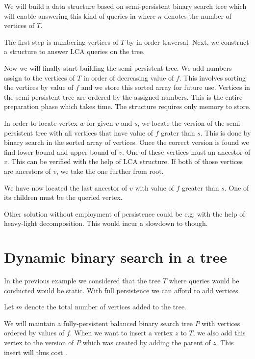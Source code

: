 We will build a data structure based on semi-persistent binary search tree which will enable answering this kind of queries in  where $n$ denotes the number of vertices of $T$.

The first step is numbering vertices of $T$ by in-order traversal. Next, we construct a structure to answer LCA queries on the tree. %

Now we will finally start building the semi-persistent tree. We add numbers assign to the vertices of $T$ in order of decreasing value of $f$. This involves sorting the vertices by value of $f$ and we store this sorted array for future use. Vertices in the semi-persistent tree are ordered by the assigned numbers. This is the entire preparation phase which takes  time. The structure requires only  memory to store.

In order to locate vertex $w$ for given $v$ and $s$, we locate the version of the semi-persistent tree with all vertices that have value of $f$ grater than $s$. This is done by binary search in the sorted array of vertices. Once the correct version is found we find lower bound and upper bound of $v$. One of these vertices must an ancestor of $v$. This can be verified with the help of LCA structure. If both of those vertices are ancestors of $v$, we take the one further from root. 

We have now located the last ancestor of $v$ with value of $f$ greater than $s$. One of its children must be the queried vertex.

Other solution without employment of persistence could be e.g. with the help of heavy-light decomposition. This would incur a slowdown to  though.

\section{Dynamic binary search in a tree}

In the previous example we considered that the tree $T$ where queries would be conducted would be static. With full persistence we can afford to add vertices. %

Let $m$ denote the total number of vertices added to the tree.

We will maintain a fully-persistent balanced binary search tree $P$ with vertices ordered by values of $f$. When we want to insert a vertex $z$ to $T$, we also add this vertex to the version of $P$ which was created by adding the parent of $z$. This insert will thus cost .

